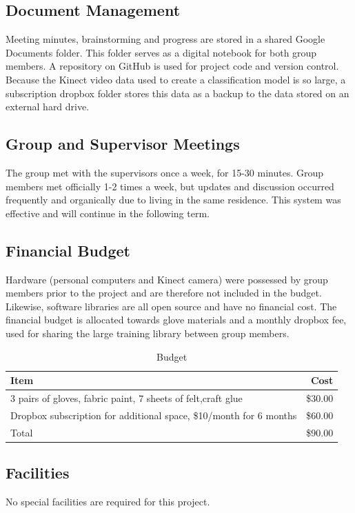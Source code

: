 \documentclass[12pt]{article}
\begin{document}
\subsection{Document Management}
Meeting minutes, brainstorming and progress are stored in a shared Google Documents folder. This folder serves as a digital notebook for both group members. A repository on GitHub is used for project code and version control. Because the Kinect video data used to create a classification model is so large, a subscription dropbox folder stores this data as a backup to the data stored on an external hard drive. 

\subsection{Group and Supervisor Meetings}
The group met with the supervisors once a week, for 15-30 minutes. Group members met officially 1-2 times a week, but updates and discussion occurred frequently and organically due to living in the same residence. This system was effective and will continue in the following term. 

\subsection{Financial Budget}
Hardware (personal computers and Kinect camera) were possessed by group members prior to the project and are therefore not included in the budget. Likewise, software libraries are all open source and have no financial cost. The financial budget is allocated towards glove materials and a monthly dropbox fee, used for sharing the large training library between group members. 

\begin{table}[h!]
\centering
\caption{Budget}
\label{table:Budget}
\vspace{1em}
\begin{tabular}{l r}

\textbf{Item}  & \textbf{Cost} \\ \hline
3 pairs of gloves, fabric paint, 7 sheets of felt,craft glue & \$30.00 \\
Dropbox subscription for additional space, \$10/month for 6 months & \$60.00 \\ \hline
Total & \$90.00 \\
\end{tabular}
\end{table}

\subsection{Facilities}
No special facilities are required for this project.
\end{document}
